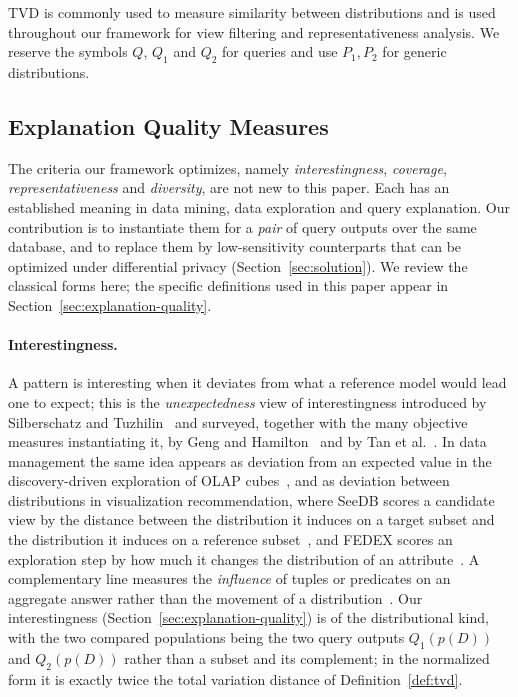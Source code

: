 TVD is commonly used to measure similarity between distributions and is used
throughout our framework for view filtering and representativeness analysis.
We reserve the symbols $Q$, $Q_1$ and $Q_2$ for queries and use $P_1,P_2$ for
generic distributions.

\subsection{Explanation Quality Measures}
\label{subsec:prelim-quality}

The criteria our framework optimizes, namely \emph{interestingness},
\emph{coverage}, \emph{representativeness} and \emph{diversity}, are not new to
this paper.
Each has an established meaning in data mining, data exploration and query
explanation.
Our contribution is to instantiate them for a \emph{pair} of query outputs over the
same database, and to replace them by low-sensitivity counterparts that can be
optimized under differential privacy (Section~\ref{sec:solution}).
We review the classical forms here; the specific definitions used in this paper
appear in Section~\ref{sec:explanation-quality}.

\paragraph{Interestingness.}
A pattern is interesting when it deviates from what a reference model would lead one
to expect; this is the \emph{unexpectedness} view of interestingness introduced by
Silberschatz and Tuzhilin~\cite{SilberschatzT96} and surveyed, together with the
many objective measures instantiating it, by Geng and
Hamilton~\cite{GengHamilton06} and by Tan et al.~\cite{TanKS02}.
In data management the same idea appears as deviation from an expected value in the
discovery-driven exploration of OLAP cubes~\cite{Sarawagi98}, and as
deviation between distributions in visualization recommendation, where SeeDB scores a
candidate view by the distance between the distribution it induces on a target
subset and the distribution it induces on a reference subset~\cite{SeeDB}, and
FEDEX scores an exploration step by how much it changes the distribution of an
attribute~\cite{FEDEX}.
A complementary line measures the \emph{influence} of tuples or predicates on an
aggregate answer rather than the movement of a distribution~\cite{wu2013,RoyS14}.
Our interestingness (Section~\ref{sec:explanation-quality}) is of the
distributional kind, with the two compared populations being the two query outputs
$Q_1(p(D))$ and $Q_2(p(D))$ rather than a subset and its complement; in the
normalized form it is exactly twice the total variation distance of
Definition~\ref{def:tvd}.

